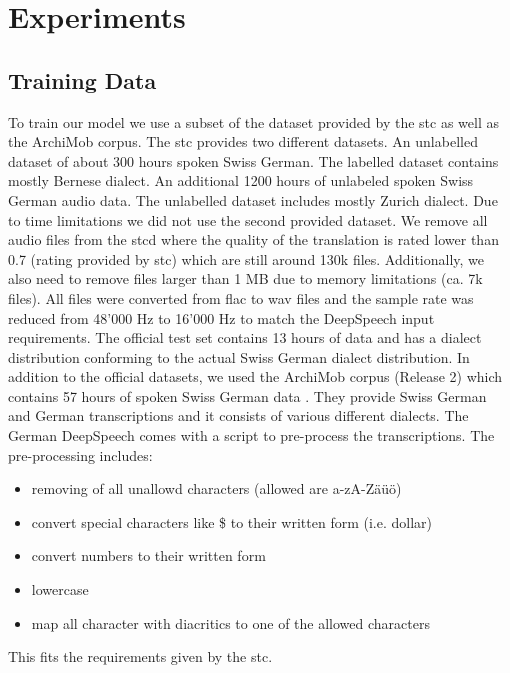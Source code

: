 \section{Experiments}

\subsection{Training Data}
To train our model we use a subset of the dataset provided by the \gls{stc} as well as the ArchiMob corpus. The \gls{stc} provides two different datasets. An unlabelled dataset of about 300 hours spoken Swiss German. The labelled dataset contains mostly Bernese dialect. An additional 1200 hours of unlabeled spoken Swiss German audio data. The unlabelled dataset includes mostly Zurich dialect. Due to time limitations we did not use the second provided dataset. We remove all audio files from the \gls{stcd} where the quality of the translation is rated lower than 0.7 (rating provided by \gls{stc}) which are still around 130k files. Additionally, we also need to remove files larger than 1 MB due to memory limitations (ca. 7k files). All files were converted from flac to wav files and the sample rate was reduced from 48'000 Hz to 16'000 Hz to match the DeepSpeech input requirements. The official test set contains 13 hours of data \cite{stc2019} and has a dialect distribution conforming to the actual Swiss German dialect distribution. In addition to the official datasets, we used the ArchiMob corpus (Release 2) which contains 57 hours of spoken Swiss German data \cite{archimob2016}. They provide Swiss German and German transcriptions and it consists of various different dialects. 
The German DeepSpeech comes with a script to pre-process the transcriptions. The pre-processing includes:
\begin{itemize}
\item removing of all unallowd characters (allowed are a-zA-Zäüö)
\item convert special characters like \$ to their written form (i.e. dollar)
\item convert numbers to their written form
\item lowercase
\item map all character with diacritics to one of the allowed characters 
\end{itemize}

This fits the requirements given by the \gls{stc}.

